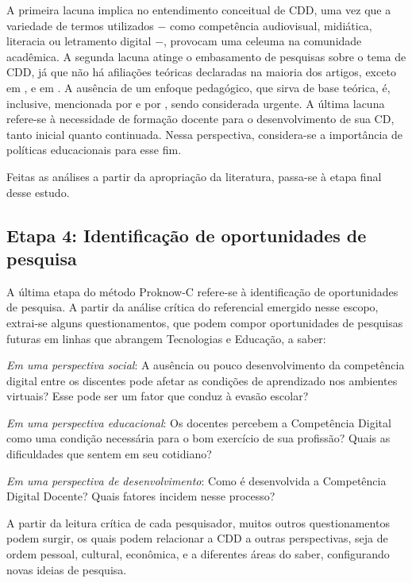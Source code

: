 \documentclass[portuguese]{textolivre}
\begin{document}
A primeira lacuna implica no entendimento conceitual de CDD, uma vez que a variedade de termos utilizados − como competência audiovisual, midiática, literacia ou letramento digital −, provocam uma celeuma na comunidade acadêmica. A segunda lacuna atinge o embasamento de pesquisas sobre o tema de CDD, já que não há afiliações teóricas declaradas na maioria dos artigos, exceto em \textcite{flores_practica_2020}, e em \textcite{engen_comprendiendo_2019}. A ausência de um enfoque pedagógico, que sirva de base teórica, é, inclusive, mencionada por \textcite{gutierrez_media_2012} e por \textcite{bravo_development_2019}, sendo considerada urgente. A última lacuna refere-se à necessidade de formação docente para o desenvolvimento de sua CD, tanto inicial quanto continuada. Nessa perspectiva, considera-se a importância de políticas educacionais para esse fim.

Feitas as análises a partir da apropriação da literatura, passa-se à etapa final desse estudo.

\subsection{Etapa 4: Identificação de oportunidades de pesquisa}

A última etapa do método Proknow-C refere-se à identificação de oportunidades de pesquisa. A partir da análise crítica do referencial emergido nesse escopo, extrai-se alguns questionamentos, que podem compor oportunidades de pesquisas futuras em linhas que abrangem Tecnologias e Educação, a saber:

\textit{Em uma perspectiva social}: A ausência ou pouco desenvolvimento da competência digital entre os discentes pode afetar as condições de aprendizado nos ambientes virtuais? Esse pode ser um fator que conduz à evasão escolar?

\textit{Em uma perspectiva educacional}: Os docentes percebem a Competência Digital como uma condição necessária para o bom exercício de sua profissão? Quais as dificuldades que sentem em seu cotidiano?

\textit{Em uma perspectiva de desenvolvimento}: Como é desenvolvida a Competência Digital Docente? Quais fatores incidem nesse processo?

A partir da leitura crítica de cada pesquisador, muitos outros questionamentos podem surgir, os quais podem relacionar a CDD a outras perspectivas, seja de ordem pessoal, cultural, econômica, e a diferentes áreas do saber, configurando novas ideias de pesquisa.
\end{document}
